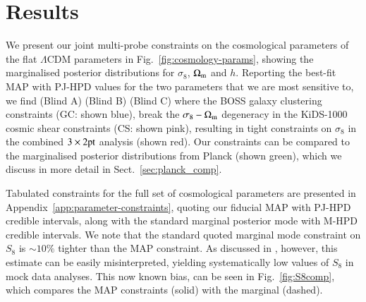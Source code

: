 \section{Results}
\label{sec:results}
We present our joint multi-probe constraints on the cosmological parameters of the flat $\Lambda$CDM parameters in Fig.~\ref{fig:cosmology-params}, showing the marginalised posterior distributions for $\sigma_8$, $\Omega_{\rm m}$ and $h$.   Reporting the best-fit MAP with PJ-HPD values for the two parameters that we are most sensitive to, we find (Blind A)
(Blind B)
(Blind C)
where the BOSS galaxy clustering constraints (GC: shown blue), break the $\sigma_8-\Omega_{\rm m}$ degeneracy in the KiDS-1000 cosmic shear constraints (CS: shown pink), resulting in tight constraints on $\sigma_8$ in the combined $3\times2{\rm pt}$ analysis (shown red).   Our constraints can be compared to the marginalised posterior distributions from Planck (shown green), which we discuss in more detail in Sect.~\ref{sec:planck_comp}.

Tabulated constraints for the full set of cosmological parameters are presented in Appendix~\ref{app:parameter-constraints}, quoting our fiducial MAP with PJ-HPD credible intervals, along with the standard marginal posterior mode with M-HPD credible intervals.   We note that the standard quoted marginal mode constraint on $S_8$ is $\sim 10\%$ tighter than the MAP constraint.  As discussed in \citet{joachimi/etal:inprep}, however, this estimate can be easily misinterpreted, yielding systematically low values of $S_8$ in mock data analyses.   This now known bias, can be seen in Fig.~\ref{fig:S8comp}, which compares the MAP constraints (solid) with the marginal (dashed).  

